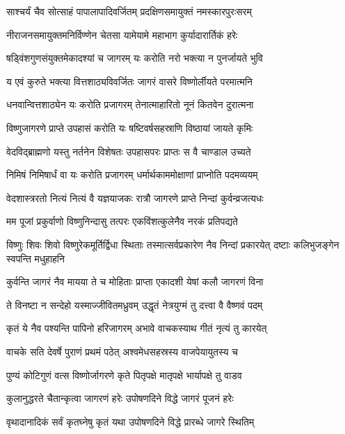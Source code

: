 \twolineshloka
{साश्चर्यं चैव सोत्साहं पापालापादिवर्जितम्}
{प्रदक्षिणसमायुक्तं नमस्कारपुरःसरम्}%

\twolineshloka
{नीराजनसमायुक्तमनिर्विण्णेन चेतसा}
{यामेयामे महाभाग कुर्यादारार्तिकं हरेः}%

\twolineshloka
{षड्विंशगुणसंयुक्तमेकादश्यां च जागरम्}
{यः करोति नरो भक्त्या न पुनर्जायते भुवि}%

\twolineshloka
{य एवं कुरुते भक्त्या वित्तशाठ्यविवर्जितः}
{जागरं वासरे विष्णोर्लीयते परमात्मनि}%

\twolineshloka
{धनवान्वित्तशाठ्येन यः करोति प्रजागरम्}
{तेनात्माहारितो नूनं कितवेन दुरात्मना}%

\twolineshloka
{विष्णुजागरणे प्राप्ते उपहासं करोति यः}
{षष्टिवर्षसहस्राणि विष्ठायां जायते कृमिः}%

\twolineshloka
{वेदविद्ब्राह्मणो यस्तु नर्तनेन विशेषतः}
{उपहासपरः प्राप्तः स वै चाण्डाल उच्यते}%

\twolineshloka
{निमिषं निमिषार्धं वा यः करोति प्रजागरम्}
{धर्मार्थकाममोक्षाणां प्राप्नोति पदमव्ययम्}%

\twolineshloka
{वेदशास्त्ररतो नित्यं नित्यं वै यज्ञयाजकः}
{रात्रौ जागरणे प्राप्ते निन्दां कुर्वन्व्रजत्यधः}%

\twolineshloka
{मम पूजां प्रकुर्वाणो विष्णुनिन्दासु तत्परः}
{एकविंशत्कुलेनैव नरकं प्रतिपद्यते}%

\threelineshloka
{विष्णुः शिवः शिवो विष्णुरेकमूर्तिर्द्विधा स्थिताः}
{तस्मात्सर्वप्रकारेण नैव निन्दां प्रकारयेत्}
{दष्टाः कलिभुजङ्गेन स्वपन्ति मधुहाहनि}%

\twolineshloka
{कुर्वन्ति जागरं नैव मायया ते च मोहिताः}
{प्राप्ता एकादशी येषां कलौ जागरणं विना}%

\twolineshloka
{ते विनष्टा न सन्देहो यस्माज्जीवितमध्रुवम्}
{उद्धृतं नेत्रयुग्मं तु दत्त्वा वै वैष्णवं पदम्}%

\twolineshloka
{कृतं ये नैव पश्यन्ति पापिनो हरिजागरम्}
{अभावे वाचकस्याथ गीतं नृत्यं तु कारयेत्}%

\twolineshloka
{वाचके सति देवर्षे पुराणं प्रथमं पठेत्}
{अश्वमेधसहस्रस्य वाजपेयायुतस्य च}%

\twolineshloka
{पुण्यं कोटिगुणं वत्स विष्णोर्जागरणे कृते}
{पितृपक्षे मातृपक्षे भार्यापक्षे तु वाडव}%

\twolineshloka
{कुलानुद्धरते चैतान्कृत्वा जागरणं हरेः}
{उपोषणदिने विद्धे जागरं पूजनं हरेः}%

\twolineshloka
{वृथादानादिकं सर्वं कृतघ्नेषु कृतं यथा}
{उपोषणदिने विद्धे प्रारब्धे जागरे स्थितिम्}%

